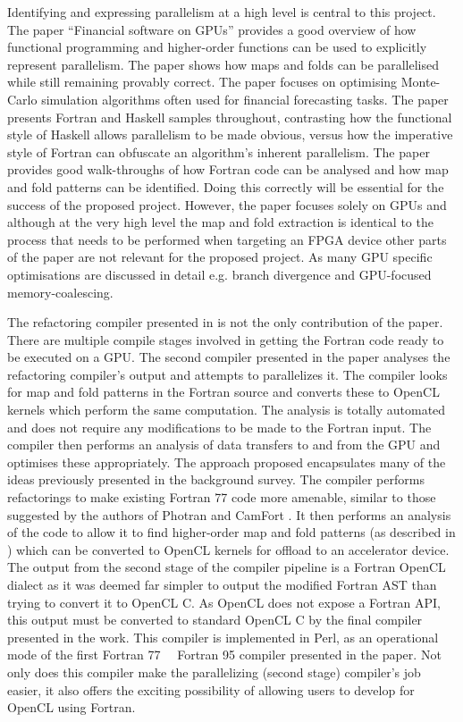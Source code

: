 \documentclass{mpaper}
\begin{document}
Identifying and expressing parallelism at a high level is central to this project. The paper ``Financial software on GPUs'' \cite{Oancea2012} provides a good overview of how functional programming and higher-order functions can be used to explicitly represent parallelism. The paper shows how maps and folds can be parallelised while still remaining provably correct. The paper focuses on optimising Monte-Carlo simulation algorithms often used for financial forecasting tasks. The paper presents Fortran and Haskell samples throughout, contrasting how the functional style of Haskell allows parallelism to be made obvious, versus how the imperative style of Fortran can obfuscate an algorithm's inherent parallelism. The paper provides good walk-throughs of how Fortran code can be analysed and how map and fold patterns can be identified. Doing this correctly will be essential for the success of the proposed project. However, the paper focuses solely on GPUs and although at the very high level the map and fold extraction is identical to the process that needs to be performed when targeting an FPGA device other parts of the paper are not relevant for the proposed project. As many GPU specific optimisations are discussed in detail e.g. branch divergence and GPU-focused memory-coalescing.

The refactoring compiler presented in \cite{VanderbauwhedeDavidson2018} is not the only contribution of the paper. There are multiple compile stages involved in getting the Fortran code ready to be executed on a GPU. The second compiler presented in the paper analyses the refactoring compiler's output and attempts to parallelizes it. The compiler looks for map and fold patterns in the Fortran source and converts these to OpenCL kernels which perform the same computation. The analysis is totally automated and does not require any modifications to be made to the Fortran input. The compiler then performs an analysis of data transfers to and from the GPU and optimises these appropriately. The approach proposed encapsulates many of the ideas previously presented in the background survey. The compiler performs refactorings to make existing Fortran 77 code more amenable, similar to those suggested by the authors of Photran \cite{Overbey2005} and CamFort \cite{Orchard2013}. It then performs  an analysis of the code to allow it to find higher-order map and fold patterns (as described in \cite{Oancea2012}) which can be converted to OpenCL kernels for offload to an accelerator device. The output from the second stage of the compiler pipeline is a Fortran OpenCL dialect as it was deemed far simpler to output the modified Fortran AST than trying to convert it to OpenCL C.  As OpenCL does not expose a Fortran API, this output must be converted to standard OpenCL C by the final compiler presented in the work. This compiler is implemented in Perl, as an operational mode of the first Fortran 77 \textrightarrow \ \ Fortran 95 compiler presented in the paper. Not only does this compiler make the parallelizing (second stage) compiler's job easier, it also offers the exciting possibility of allowing users to develop for OpenCL using Fortran.
\end{document}
